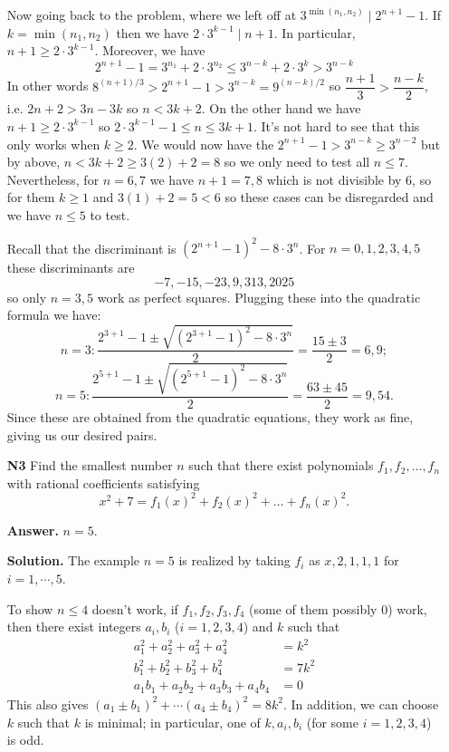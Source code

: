 \documentclass[11pt]{article}
\newcommand{\<}{\langle}
\renewcommand{\>}{\rangle}
\begin{document}
\begin{enumerate}
	Now going back to the problem, where we left off at $3^{\min(n_1, n_2)}\mid 2^{n+1}-1$. If $k=\min(n_1, n_2)$ then we have $2\cdot 3^{k-1}\mid n+1$. In particular, $n+1\ge 2\cdot 3^{k-1}$.  Moreover, we have 
	\[2^{n+1}-1= 3^{n_1}+2\cdot 3^{n_2}\le 3^{n-k}+2\cdot 3^k > 3^{n-k}
	\]
	In other words $8^{(n+1)/3}>2^{n+1}-1 > 3^{n-k}=9^{(n-k)/2}$ so $\dfrac{n+1}{3}> \dfrac{n-k}{2}$, i.e. $2n+2> 3n-3k$ so $n<3k+2$. On the other hand we have $n+1\ge 2\cdot 3^{k-1}$ so $2\cdot 3^{k-1} -1 \le n\le 3k+1$. It's not hard to see that this only works when $k\ge 2$. We would now have the $2^{n+1}-1>3^{n-k}\ge 3^{n-2}$ but by above, $n<3k+2\ge 3(2)+2=8$ so we only need to test all $n\le 7$. Nevertheless, for $n=6, 7$ we have $n+1=7, 8$ which is not divisible by 6, so for them $k\ge 1$ and $3(1)+2=5<6$ so these cases can be disregarded and we have $n\le 5$ to test. 
	
	Recall that the discriminant is $(2^{n+1}-1)^2-8\cdot 3^n$. 
	For $n=0, 1, 2, 3, 4, 5$ these discriminants are \[-7, -15, -23, 9, 313, 2025\] 
	so only $n=3, 5$ work as perfect squares. Plugging these into the quadratic formula we have: 
	\[
	n=3: \dfrac{2^{3+1}-1 \pm \sqrt{(2^{3+1}-1)^2 - 8\cdot 3^n}}{2} = \dfrac{15\pm 3}{2}=6, 9;\]\[
	n = 5: \dfrac{2^{5+1}-1 \pm \sqrt{(2^{5+1}-1)^2 - 8\cdot 3^n}}{2} = \dfrac{63\pm 45}{2} = 9, 54. 
	\]
	Since these are obtained from the quadratic equations, they work as fine, giving us our desired pairs. 
	
	\item[\textbf{N3}] 
	Find the smallest number $n$ such that there exist polynomials $f_1, f_2, \ldots , f_n$ with rational coefficients satisfying\[x^2+7 = f_1\left(x\right)^2 + f_2\left(x\right)^2 + \ldots + f_n\left(x\right)^2.\]
	
	\textbf{Answer.} $n = 5$. 
	
	\textbf{Solution.} The example $n = 5$ is realized by taking $f_i$ as $x, 2, 1, 1, 1$
	for $i=1, \cdots, 5$. 
	
	To show $n\le 4$ doesn't work, if $f_1, f_2, f_3, f_4$ (some of them possibly 0) work, 
	then there exist integers $a_i, b_i$ ($i=1,2,3,4$) and $k$ such that 
	\begin{align}
		a_1^2+a_2^2+a_3^2+a_4^2 &= k^2\nonumber\\
		b_1^2+b_2^2+b_3^2+b_4^2 &= 7k^2\nonumber\\
		a_1b_1+a_2b_2+a_3b_3+a_4b_4 & = 0
	\end{align}
    This also gives $(a_1\pm b_1)^2+\cdots (a_4\pm b_4)^2=8k^2$. 
    In addition, we can choose $k$ such that $k$ is minimal; 
    in particular, one of $k, a_i, b_i$ (for some $i=1,2,3,4$) is odd. 
    

\end{enumerate}
\end{document}
